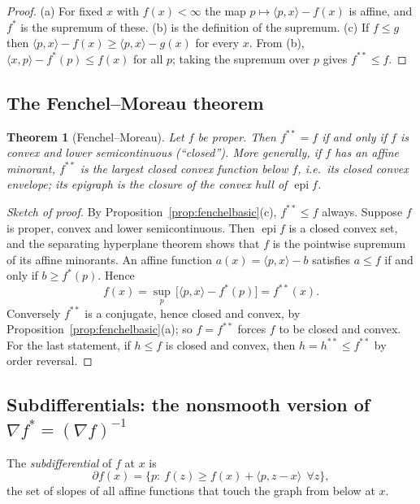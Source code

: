 \documentclass[11pt,a4paper]{article}
\newcommand{\ip}[2]{\langle #1,#2\rangle}
\DeclareMathOperator{\epi}{epi}
\theoremstyle{plain}
\newtheorem{theorem}{Theorem}[section]
\theoremstyle{definition}
\theoremstyle{remark}
\begin{document}
\begin{proof}
(a) For fixed $x$ with $f(x)<\infty$ the map $p\mapsto\ip{p}{x}-f(x)$ is affine,
and $f^*$ is the supremum of these.  (b) is the definition of the supremum.
(c) If $f\le g$ then $\ip{p}{x}-f(x)\ge\ip{p}{x}-g(x)$ for every $x$.  From (b),
$\ip{x}{p}-f^*(p)\le f(x)$ for all $p$; taking the supremum over $p$ gives
$f^{**}\le f$.
\end{proof}

\subsection{The Fenchel--Moreau theorem}

\begin{theorem}[Fenchel--Moreau]\label{thm:fm}
Let $f$ be proper. Then $f^{**}=f$ if and only if $f$ is convex and lower
semicontinuous (``closed'').  More generally, if $f$ has an affine minorant,
$f^{**}$ is the largest closed convex function below $f$, i.e.\ its
\emph{closed convex envelope}; its epigraph is the closure of the convex hull
of $\epi f$.
\end{theorem}

\begin{proof}[Sketch of proof]
By Proposition~\ref{prop:fenchelbasic}(c), $f^{**}\le f$ always.  Suppose $f$
is proper, convex and lower semicontinuous.  Then $\epi f$ is a closed convex
set, and the separating hyperplane theorem shows that $f$ is the pointwise
supremum of its affine minorants.  An affine function
$a(x)=\ip{p}{x}-b$ satisfies $a\le f$ if and only if $b\ge f^*(p)$.  Hence
\[
  f(x)=\sup_{p}\,\bigl[\ip{p}{x}-f^*(p)\bigr]=f^{**}(x).
\]
Conversely $f^{**}$ is a conjugate, hence closed and convex, by
Proposition~\ref{prop:fenchelbasic}(a); so $f=f^{**}$ forces $f$ to be closed
and convex.  For the last statement, if $h\le f$ is closed and convex, then
$h=h^{**}\le f^{**}$ by order reversal.
\end{proof}

\subsection{Subdifferentials: the nonsmooth version of \texorpdfstring{$\nabla f^*=(\nabla f)^{-1}$}{grad f* is the inverse of grad f}}

The \emph{subdifferential} of $f$ at $x$ is
\[
  \partial f(x)=\bigl\{p:\ f(z)\ge f(x)+\ip{p}{z-x}\ \ \forall z\bigr\},
\]
the set of slopes of all affine functions that touch the graph from below at
$x$.
\end{document}
